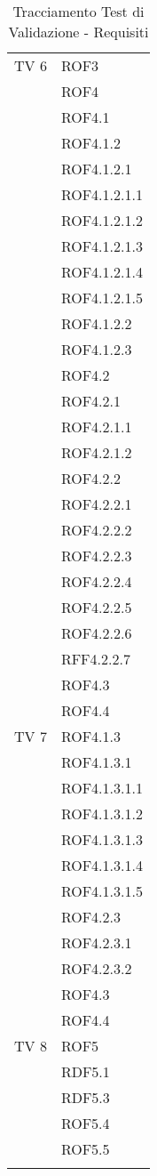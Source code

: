 \begin{center}
\begin{longtable}{|p{7cm}|p{7cm}|}
TV 6 & ROF3\\ &  ROF4\\ &  ROF4.1\\ &  ROF4.1.2\\ &  ROF4.1.2.1\\ &  ROF4.1.2.1.1\\ &  ROF4.1.2.1.2\\ &  ROF4.1.2.1.3\\ &  ROF4.1.2.1.4\\ &  ROF4.1.2.1.5\\ &  ROF4.1.2.2\\ &  ROF4.1.2.3\\ &  ROF4.2\\ &  ROF4.2.1\\ &  ROF4.2.1.1\\ &  ROF4.2.1.2\\ &  ROF4.2.2\\ &  ROF4.2.2.1\\ &  ROF4.2.2.2\\ &  ROF4.2.2.3\\ &  ROF4.2.2.4\\ &  ROF4.2.2.5\\ &  ROF4.2.2.6\\ &  RFF4.2.2.7\\ &  ROF4.3\\ &  ROF4.4\\
\midrule
TV 7 & ROF4.1.3\\ &  ROF4.1.3.1\\ &  ROF4.1.3.1.1\\ &  ROF4.1.3.1.2\\ &  ROF4.1.3.1.3\\ &  ROF4.1.3.1.4\\ &  ROF4.1.3.1.5\\ &  ROF4.2.3\\ &  ROF4.2.3.1\\ &  ROF4.2.3.2\\ &  ROF4.3\\ &  ROF4.4\\
\midrule
TV 8 & ROF5\\ &  RDF5.1\\ &  RDF5.3\\ &  ROF5.4\\ &  ROF5.5\\

\bottomrule
\caption{Tracciamento Test di Validazione - Requisiti}
\label{tab:changelog}
\end{longtable}
\end{center}
